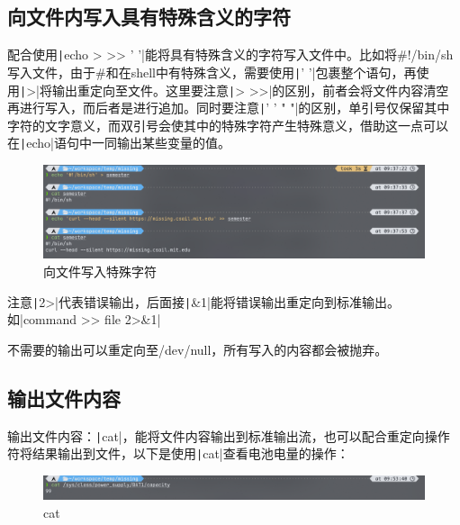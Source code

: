 \documentclass[fontset=ubuntu]{ctexart}
\begin{document}
\begin{sloppypar}
\subsection{向文件内写入具有特殊含义的字符}
配合使用\texttt|echo > >> ' '|能将具有特殊含义的字符写入文件中。比如将\#!/bin/sh写入文件，由于\#和\!在shell中有特殊含义，需要使用\texttt|' '|包裹整个语句，再使用\texttt|>|将输出重定向至文件。这里要注意\texttt|> >>|的区别，前者会将文件内容清空再进行写入，而后者是进行追加。同时要注意\texttt|' ' " "|的区别，单引号仅保留其中字符的文字意义，而双引号会使其中的特殊字符产生特殊意义，借助这一点可以在\texttt|echo|语句中一同输出某些变量的值。
\begin{figure}[htb]
    \centering
    \includegraphics[width=0.75\linewidth]{To file.png}
    \caption{向文件写入特殊字符}
    \label{fig:to file}
\end{figure}

注意\texttt|2>|代表错误输出，后面接\texttt|&1|能将错误输出重定向到标准输出。如|command >> file 2>&1|

不需要的输出可以重定向至/dev/null，所有写入的内容都会被抛弃。

\subsection{输出文件内容}
输出文件内容：\texttt|cat|，能将文件内容输出到标准输出流，也可以配合重定向操作符将结果输出到文件，以下是使用\texttt|cat|查看电池电量的操作：
\begin{figure}[htb]
    \centering
    \includegraphics[width=0.75\linewidth]{Cat.png}
    \caption{cat}
    \label{fig:cat}
\end{figure}


\end{sloppypar}
\end{document}
